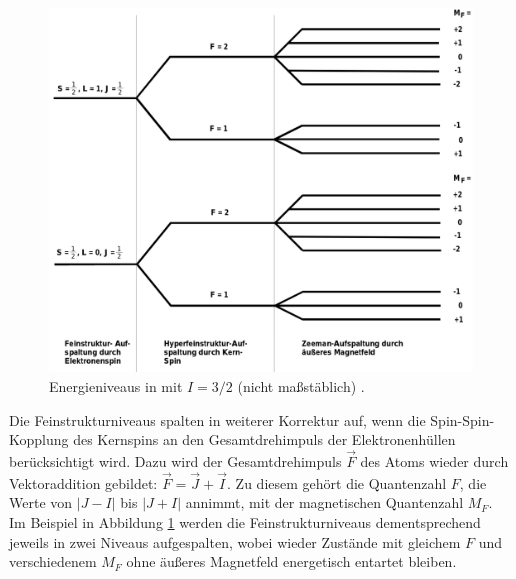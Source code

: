   \begin{figure}
    \centering
    \includegraphics[width=\textwidth]{pictures/energieniveaus.png}
    \caption{Energieniveaus in  mit $I=3/2$ (nicht maßstäblich) \cite{VersuchsanleitungAlt}.}
    \label{fig:energieniveaus}
  \end{figure}

  Die Feinstrukturniveaus spalten in weiterer Korrektur auf, wenn die Spin-Spin-Kopplung des Kernspins an den Gesamtdrehimpuls der Elektronenhüllen berücksichtigt wird. Dazu wird der Gesamtdrehimpuls $\vec{F}$ des Atoms wieder durch Vektoraddition gebildet: $\vec{F} = \vec{J} + \vec{I}$. Zu diesem gehört die Quantenzahl $F$, die Werte von $\lvert J - I \rvert$ bis $\lvert J + I \rvert$ annimmt, mit der magnetischen Quantenzahl $M_F$. Im Beispiel in Abbildung \ref{fig:energieniveaus} werden die Feinstrukturniveaus dementsprechend jeweils in zwei Niveaus aufgespalten, wobei wieder Zustände mit gleichem $F$ und verschiedenem $M_F$ ohne äußeres Magnetfeld energetisch entartet bleiben.

